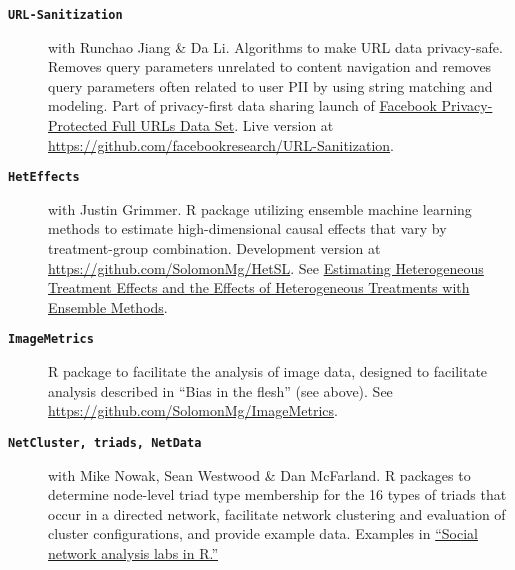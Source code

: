 \documentclass[letterpaper,11pt]{article}
\begin{document}
\begin{description}

\item[\large{\textbf{\texttt{URL-Sanitization}}}] with Runchao Jiang \& Da Li. Algorithms to make URL data privacy-safe. Removes query parameters unrelated to content navigation and removes query parameters often related to user PII by using string matching and modeling. Part of privacy-first data sharing launch of \href{https://solomonmg.github.io/pdf/Facebook_DP_URLs_Dataset.pdf}{Facebook Privacy-Protected Full URLs Data Set}. Live version at \url{https://github.com/facebookresearch/URL-Sanitization}.

\item[\large{\textbf{\texttt{HetEffects}}}] with Justin Grimmer. R package utilizing ensemble machine learning methods to estimate high-dimensional causal effects that vary by treatment-group combination. Development version at \url{https://github.com/SolomonMg/HetSL}. See \href{http://stanford.edu/~jgrimmer/het.pdf}{Estimating Heterogeneous Treatment Effects and the Effects of Heterogeneous Treatments with Ensemble Methods}.

\item[\large{\textbf{\texttt{ImageMetrics}}}] R package to facilitate the analysis of image data,
designed to facilitate analysis described in ``Bias in the flesh'' (see above). See \url{https://github.com/SolomonMg/ImageMetrics}.


\item[\large{\textbf{\texttt{NetCluster, triads, NetData}}}] with Mike Nowak, Sean Westwood \& Dan McFarland. R packages to determine node-level triad type membership for the 16 types of triads that occur in a directed network, facilitate network clustering and evaluation of cluster configurations, and provide example data.  Examples in \href{http://sna.stanford.edu/rlabs.php}{``Social network analysis labs in R.''} 

%

\end{description}
\end{document}
